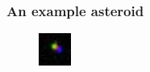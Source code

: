 \documentclass{beamer}
\begin{document}
{
    \begin{frame}[plain] \end{frame}
}

{
    \begin{frame}[plain] \end{frame}
}

\begin{frame}
    \frametitle{An example asteroid}
    \begin{figure}
        \centering
        \includegraphics{18364.jpg}
    \end{figure}
\end{frame}
\end{document}
